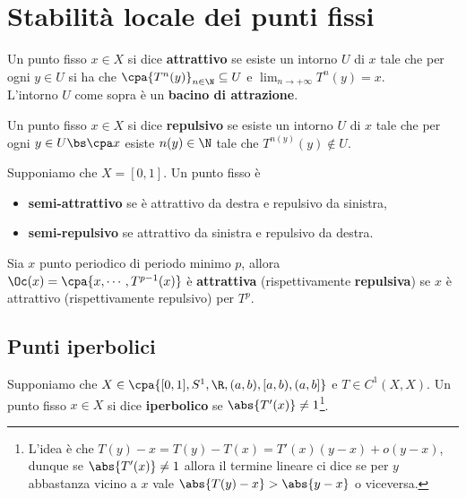 \chapter{Stabilit\`a locale dei punti fissi}
\begin{definition}
Un punto fisso $x\in X$ si dice \textbf{attrattivo} se esiste un intorno $U$ di $x$ tale che per ogni $y\in U$ si ha che $\cpa{T^n(y)}_{n\in\N}\subseteq U$ e $\displaystyle\lim_{n\to+\infty}T^n(y)=x$.\\
L'intorno $U$ come sopra \`e un \textbf{bacino di attrazione}.
\vspace{0.25cm}

\noindent
Un punto fisso $x\in X$ si dice \textbf{repulsivo} se esiste un intorno $U$ di $x$ tale che per ogni $y\in U\bs \cpa x$ esiste $n(y)\in\N$ tale che $T^{n(y)}(y)\notin U$.
\end{definition}

\begin{definition}
Supponiamo che $X=[0,1]$. Un punto fisso \`e
\begin{itemize}
\item \textbf{semi-attrattivo} se \`e attrattivo da destra e repulsivo da sinistra,
\item \textbf{semi-repulsivo} se attrattivo da sinistra e repulsivo da destra.
\end{itemize}
\end{definition}

\begin{definition}
Sia $x$ punto periodico di periodo minimo $p$, allora $\Oc(x)=\cpa{x,\cdots, T^{p-1}(x)}$ \`e \textbf{attrattiva} (rispettivamente \textbf{repulsiva}) se $x$ \`e attrattivo (rispettivamente repulsivo) per $T^p$.
\end{definition}

\section{Punti iperbolici}
\begin{definition}
Supponiamo che $X\in\cpa{[0,1], S^1, \R, (a,b), [a,b), (a,b]}$ e $T\in C^1(X,X)$. Un punto fisso $x\in X$ si dice \textbf{iperbolico} se $\abs{T'(x)}\neq 1$\footnote{L'idea \`e che $T(y)-x=T(y)-T(x)=T'(x)(y-x)+o(y-x)$, dunque se $\abs{T'(x)}\neq 1$ allora il termine lineare ci dice se per $y$ abbastanza vicino a $x$ vale $\abs{T(y)-x}>\abs{y-x}$ o viceversa.}.
\end{definition}

